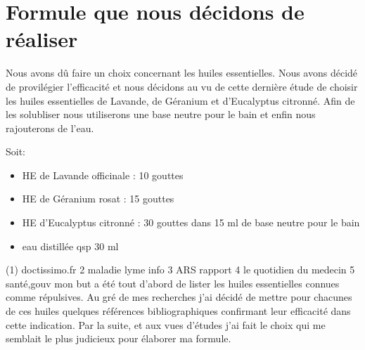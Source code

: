 \documentclass[12pt,a4wide]{article}
\begin{document}
\section{Formule que nous décidons de réaliser}
\label{sec-5}

Nous avons  dû faire  un choix  concernant les  huiles essentielles.  Nous avons
décidé de  provilégier l'efficacité  et nous  décidons au  vu de  cette dernière
étude de choisir les huiles essentielles de Lavande, de Géranium et d'Eucalyptus
citronné. Afin de  les solubliser nous utiliserons une base  neutre pour le bain
et enfin nous rajouterons de l'eau.

Soit:
\begin{itemize}
\item HE de Lavande officinale : 10 gouttes
\item HE de Géranium rosat : 15 gouttes
\item HE d'Eucalyptus citronné : 30 gouttes dans 15 ml de base neutre pour le bain
\item eau distillée qsp 30 ml
\end{itemize}









(1) doctissimo.fr
2 maladie lyme info
3 ARS rapport
4 le quotidien du medecin
5 santé,gouv
 mon but  a été  tout d'abord  de lister  les huiles
essentielles connues comme  répulsives. Au gré de mes recherches  j'ai décidé de
mettre  pour  chacunes  de   ces  huiles  quelques  références  bibliographiques
confirmant leur  efficacité dans  cette indication.  Par la  suite, et  aux vues
d'études j'ai fait le  choix qui me semblait le plus  judicieux pour élaborer ma
formule.
\end{document}
